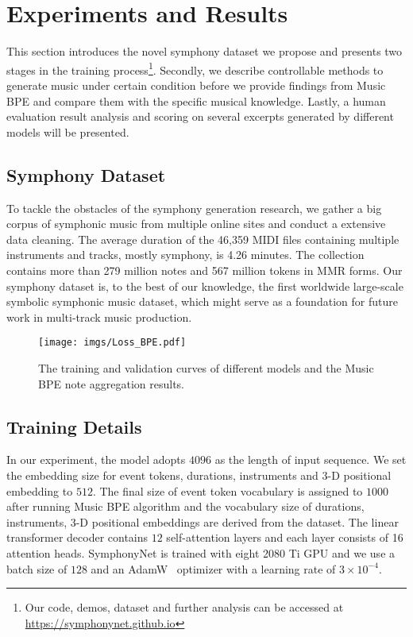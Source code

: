 \documentclass{article}
\begin{document}
\section{Experiments and Results} \label{Result}
This section introduces the novel symphony dataset we propose and presents two stages in the training process\footnote{Our code, demos, dataset and further analysis can be accessed at \href{https://symphonynet.github.io}{https://symphonynet.github.io}}. Secondly, we describe controllable methods to generate music under certain condition before  we provide findings from Music BPE and compare them with the specific musical knowledge. Lastly, a human evaluation result analysis and scoring on several excerpts generated by different models will be presented.

\subsection{Symphony Dataset}
To tackle the obstacles of the symphony generation research, we gather a big corpus of symphonic music from multiple online sites and conduct a extensive data cleaning. The average duration of the 46,359 MIDI files containing multiple instruments and tracks, mostly symphony, is 4.26 minutes. The collection contains more than 279 million notes and 567 million tokens in MMR forms. Our symphony dataset is, to the best of our knowledge, the first worldwide large-scale symbolic symphonic music dataset, which might serve as a foundation for future work in multi-track music production.


\begin{figure}[t]
  \centering
  \centerline{\texttt{[image: imgs/Loss\_BPE.pdf]}}
  \caption{The training and validation curves of different models and the Music BPE note aggregation results.}
  \label{fig:loss}
\end{figure}

\subsection{Training Details}
In our experiment, the model adopts $4096$ as the length of input sequence. We set the embedding size for event tokens, durations, instruments and 3-D positional embedding to $512$. The final size of event token vocabulary is assigned to $1000$ after running Music BPE algorithm and the vocabulary size of durations, instruments, 3-D positional embeddings are derived from the dataset. The linear transformer decoder contains $12$ self-attention layers and each layer consists of 16 attention heads. SymphonyNet is trained with eight 2080 Ti GPU and we use a batch size of $128$ and an AdamW~\cite{adamw} optimizer with a learning rate of $3 \times 10^{-4}$. 
\end{document}

